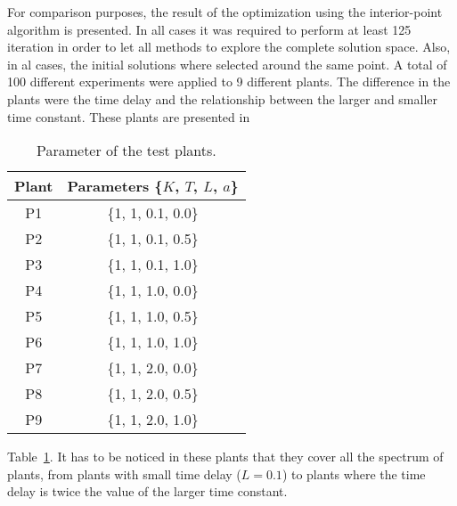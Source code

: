 For comparison purposes, the result of the optimization using the interior-point algorithm is presented. In all cases it was required to  perform at least 125 iteration in order to let all methods to explore the complete solution space. Also, in al cases, the initial solutions where selected around the same point. A total of 100 different experiments were applied to 9 different plants. The difference in the plants were the time delay and the relationship between the larger and smaller time constant. These plants are presented in %
%
\begin{table}[tb]%
	\centering
	\caption{Parameter of the test plants.}
	\label{tab:Plants}
	\begin{tabular}{cc}
		\toprule
		Plant & Parameters \{$K$, $T$, $L$, $a$\}\\
		\midrule
		P1 & \{1, 1, 0.1, 0.0\}\\
		P2 & \{1, 1, 0.1, 0.5\}\\
		P3 & \{1, 1, 0.1, 1.0\}\\
		P4 & \{1, 1, 1.0, 0.0\}\\
		P5 & \{1, 1, 1.0, 0.5\}\\
		P6 & \{1, 1, 1.0, 1.0\}\\
		P7 & \{1, 1, 2.0, 0.0\}\\
		P8 & \{1, 1, 2.0, 0.5\}\\
		P9 & \{1, 1, 2.0, 1.0\}\\
		\bottomrule
	\end{tabular}
\end{table}
%
Table~\ref{tab:Plants}. It has to be noticed in these plants that they cover all the spectrum of plants, from plants with small time delay ($L=0.1$) to plants where the time delay is twice the value of the larger time constant.

